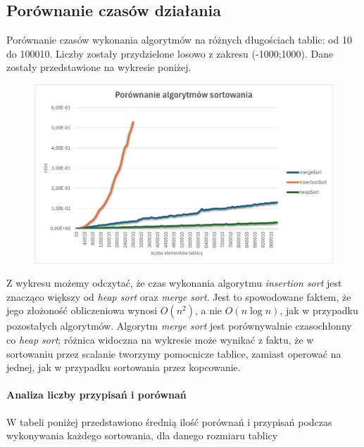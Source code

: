 \documentclass{article}
\begin{document}
	
	
	
	\subsection{Porównanie czasów działania}
	Porównanie czasów wykonania algorytmów na różnych długościach tablic: od 10 do 100010. Liczby zostały przydzielone losowo z zakresu (-1000;1000). Dane zostały przedstawione na wykresie poniżej.
	
	\begin{figure}[H]
	     \centering
	     \includegraphics[width=\textwidth]{porowanie.png}
	\end{figure}
	
	Z wykresu możemy odczytać, że czas wykonania algorytmu \textit{insertion sort} jest znacząco większy od \textit{heap sort} oraz \textit{merge sort}. Jest to spowodowane faktem, że jego złożoność obliczeniowa wynosi $O(n^2)$, a nie $O(n \log n)$, jak w przypadku pozostałych algorytmów. Algorytm \textit{merge sort} jest porównywalnie czasochłonny co \textit{heap sort}; różnica widoczna na wykresie może wynikać z faktu, że w sortowaniu przez scalanie tworzymy pomocnicze tablice, zamiast operować na jednej, jak w przypadku sortowania przez kopcowanie.
	 
	 
	 
	
	\paragraph{Analiza liczby przypisań i porównań\\}
	W tabeli poniżej przedstawiono średnią ilość porównań i przypisań podczas wykonywania każdego sortowania, dla danego rozmiaru tablicy
	
\end{document}
